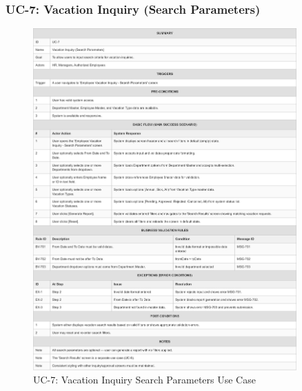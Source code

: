 \documentclass[12pt,a4paper]{article}
\begin{document}
\subsubsection{UC-7: Vacation Inquiry (Search Parameters)}
\begin{figure}[H]
\centering
\includegraphics[width=0.9\textwidth]{Use-Cases/UC-7-Vacation-Inquiry-Search-Parameters/UC-7-Vacation-Inquiry-Search-Parameters-1.png}
\caption{UC-7: Vacation Inquiry Search Parameters Use Case}
\label{fig:uc7}
\end{figure}
\end{document}
